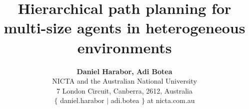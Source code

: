 \documentclass[conference]{IEEEtran}
\begin{document}
\title{Hierarchical path planning for multi-size agents in heterogeneous environments}
\author{\textbf{Daniel Harabor, Adi Botea} \\ NICTA and the Australian National University \\ 7 London Circuit, Canberra, 2612, Australia \\ $\lbrace$ daniel.harabor $|$ adi.botea $\rbrace$ at nicta.com.au 
}

\maketitle









 









%
%
%
%
\end{document}
